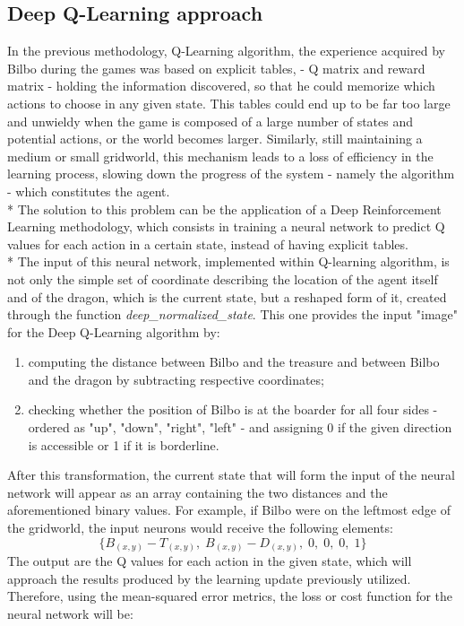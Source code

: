 \subsection{Deep Q-Learning approach}
In the previous methodology, Q-Learning algorithm, the experience acquired by Bilbo during the games was based on explicit tables, - Q matrix and reward matrix - holding the information discovered, so that he could memorize which actions to choose in any given state. This tables could end up to be far too large and unwieldy when the game is composed of a large number of states and potential actions, or the world becomes larger. Similarly, still maintaining a medium or small gridworld, this mechanism leads to a loss of efficiency in the learning process, slowing down the progress of the system - namely the algorithm - which constitutes the agent.\\*
The solution to this problem can be the application of a Deep Reinforcement Learning methodology, which consists in training a neural network to predict Q values for each action in a certain state, instead of having explicit tables.\\*
The input of this neural network, implemented within Q-learning algorithm, is not only the simple set of coordinate describing the location of the agent itself and of the dragon, which is the current state, but a reshaped form of it, created through the function \textit{deep\_normalized\_state}. This one provides the input "image" for the Deep Q-Learning algorithm by:
\begin{enumerate}
  \item computing the distance between Bilbo and the treasure and between Bilbo and the dragon by subtracting respective coordinates;
  \item checking whether the position of Bilbo is at the boarder  for all four sides - ordered as "up", "down", "right", "left" - and assigning 0 if the given direction is accessible or 1 if it is borderline.
\end{enumerate}
After this transformation, the current state that will form the input of the neural network will appear as an array containing the two distances and the aforementioned binary values. For example, if Bilbo were on the leftmost edge of the gridworld, the input neurons would receive the following elements:
$$
\{B_{(x,y)}-T_{(x,y)},\;B_{(x,y)}-D_{(x,y)},\;0,\;0,\;0,\;1\}
$$
The output are the Q values for each action in the given state, which will approach the results produced by the learning update previously utilized. Therefore, using the mean-squared error metrics, the loss or cost function for the neural network will be:
